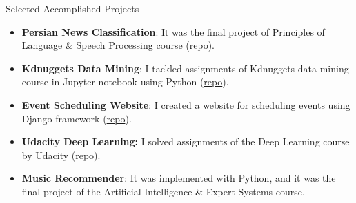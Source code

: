 \documentclass[]{mcdowellcv}
\begin{document}
\begin{cvsection}{Selected Accomplished Projects}
\begin{cvsubsection}{}{}{}
\begin{itemize}
        	    \item \textbf{Persian News Classification}: It was the final project of Principles of Language \& Speech Processing course (\href{https://github.com/Nikronic/NLP-Fall18-UOG/}{repo}).
        	    \item \textbf{Kdnuggets Data Mining}: I tackled assignments of Kdnuggets data mining course in Jupyter notebook using Python (\href{https://github.com/erfanMhi/kdnuggets-data-mining-course}{repo}).
        	    \item \textbf{Event Scheduling Website}: I created a website for scheduling events using Django framework (\href{https://github.com/erfanMhi/School-Of-AI-Rasht-Chapter-Website}{repo}).
        	    \item \textbf{Udacity Deep Learning:} I solved assignments of the Deep Learning course by Udacity
        	    (\href{https://github.com/erfanMhi/Udacity-Deep-Learning-Assignment}{repo}).
        	    \item \textbf{Music Recommender}: It was implemented with Python, and it was the final project of the Artificial Intelligence \& Expert Systems course.

\end{itemize}
\end{cvsubsection}
\end{cvsection}
\end{document}
